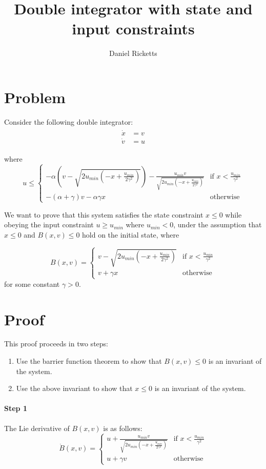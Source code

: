\documentclass[12pt]{article}
\title{Double integrator with state and input constraints}
\author{Daniel Ricketts}
\newcommand{\umin}{u_{min}}
\newcommand{\p}{\gamma}
\newcommand{\q}{\alpha}
\begin{document}
\maketitle

\section{Problem}
Consider the following double integrator:
\begin{align}
\begin{split}
\dot{x} &= v \\
\dot{v} &= u
\end{split}
\label{sys1}
\end{align}

where
\[
u \leq
\begin{cases}
-\q(v - \sqrt{2\umin(-x + \frac{\umin}{2\p^2})}) - \frac{\umin v}{\sqrt{2\umin(-x + \frac{\umin}{2\p^2})}} & \text{if } x < \frac{\umin}{\p^2}\\
-(\q + \p) v -\q\p x & \text{otherwise}
\end{cases}
\]

We want to prove that this system satisfies the state constraint $x \leq 0$
while obeying the input constraint $u \geq \umin$ where $\umin < 0$, under
the assumption that $x \leq 0$ and $B(x,v) \leq 0$ hold on the initial
state, where

\[B(x,v) =
\begin{cases}
v - \sqrt{2\umin(-x + \frac{\umin}{2\p^2})} & \text{if } x < \frac{\umin}{\p^2}\\
v + \p x & \text{otherwise}
\end{cases}
\]
for some constant $\p > 0$.

\section{Proof}
This proof proceeds in two steps:
\begin{enumerate}
\item Use the barrier function theorem to show that $B(x,v) \leq 0$ is an invariant of the system.
\item Use the above invariant to show that $x \leq 0$ is an invariant of the system.
\end{enumerate}

\paragraph*{Step 1}
The Lie derivative of $B(x,v)$ is as follows:
\[\dot{B}(x,v) =
\begin{cases}
u + \frac{\umin v}{\sqrt{2\umin(-x + \frac{\umin}{2\p^2})}} & \text{if } x < \frac{\umin}{\p^2}\\
u + \p v & \text{otherwise}
\end{cases}
\]
\end{document}
